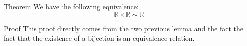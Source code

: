 \documentclass[a4paper]{article}
\begin{document}
\begin{parag}{Theorem}
    We have the following equivalence: 
    \[\mathbb{R} \times \mathbb{R} \sim \mathbb{R}\]

    \begin{subparag}{Proof}
        This proof directly comes from the two previous lemma and the fact the fact that the existence of a bijection is an equivalence relation.
    \end{subparag}
\end{parag}
\end{document}
